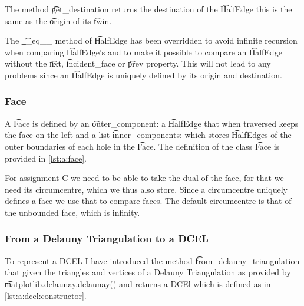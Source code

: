 	The method \t{get_destination} returns the destination of the \t{HalfEdge} this is the same as the \t{origin} of its \t{twin}.

	The \t{__eq__} method of \t{HalfEdge} has been overridden to avoid infinite recursion when comparing \t{HalfEdge}'s and to make it possible to compare an \t{HalfEdge} without the \t{nxt}, \t{incident_face} or \t{prev} property. This will not lead to any problems since an \t{HalfEdge} is uniquely defined by its origin and destination.
	

\subsubsection*{Face}
	A \t{Face} is defined by an \t{outer_component}: a \t{HalfEdge} that when traversed keeps the face on the left and a list \t{inner_components}: which stores \t{HalfEdge}s of the outer boundaries of each hole in the \t{Face}. The definition of the class \t{Face} is provided in \autoref{lst:a:face}. 

	For assignment C we need to be able to take the dual of the face, for that we need its circumcentre, which we thus also store. Since a circumcentre uniquely defines a face we use that to compare faces. The default circumcentre is that of the unbounded face, which is infinity.

	

\subsubsection*{From a Delauny Triangulation to a DCEL}
	To represent a DCEL I have introduced the method \t{from_delauny_triangulation} that given the triangles and vertices of a Delauny Triangulation as provided by \t{matplotlib.delaunay.delaunay()} and returns a DCEl which is defined as in \autoref{lst:a:dcel:constructor}. 

	

